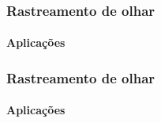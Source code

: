 \documentclass[11pt]{beamer}
\begin{document}
\begin{frame}
\frametitle{Rastreamento de olhar}
\framesubtitle{Aplicações}
\begin{figure}
\end{figure}
\end{frame}

\begin{frame}
\frametitle{Rastreamento de olhar}
\framesubtitle{Aplicações}
\begin{figure}
\end{figure}
\end{frame}
\end{document}
